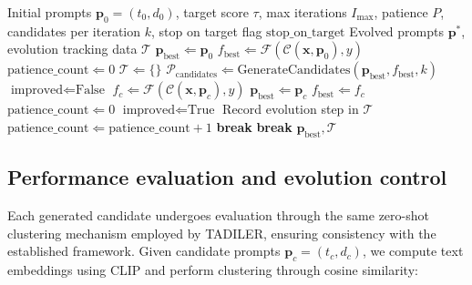 \documentclass[pdflatex,sn-mathphys-num]{sn-jnl}%
\theoremstyle{thmstyleone}%
\theoremstyle{thmstyletwo}%
\theoremstyle{thmstylethree}%
\begin{document}
\begin{algorithm}
\caption{Adaptive Prompt Evolution Algorithm}\label{alg:ape_evolution}
\begin{algorithmic}[1]
\Require Initial prompts $\mathbf{p}_0 = (t_0, d_0)$, target score $\tau$, max iterations $I_{\text{max}}$, patience $P$, candidates per iteration $k$, stop on target flag $\text{stop\_on\_target}$
\Ensure Evolved prompts $\mathbf{p}^*$, evolution tracking data $\mathcal{T}$
\State $\mathbf{p}_{\text{best}} \Leftarrow \mathbf{p}_0$
\State $f_{\text{best}} \Leftarrow \mathcal{F}(\mathcal{C}(\mathbf{x}, \mathbf{p}_0), y)$
\State $\text{patience\_count} \Leftarrow 0$
\State $\mathcal{T} \Leftarrow \{\}$ 
    \State $\mathcal{P}_{\text{candidates}} \Leftarrow \text{GenerateCandidates}(\mathbf{p}_{\text{best}}, f_{\text{best}}, k)$
    \State $\text{improved} \Leftarrow \text{False}$
        \State $f_c \Leftarrow \mathcal{F}(\mathcal{C}(\mathbf{x}, \mathbf{p}_c), y)$
            \State $\mathbf{p}_{\text{best}} \Leftarrow \mathbf{p}_c$
            \State $f_{\text{best}} \Leftarrow f_c$
            \State $\text{patience\_count} \Leftarrow 0$
            \State $\text{improved} \Leftarrow \text{True}$
            \State Record evolution step in $\mathcal{T}$
        \EndIf
    \EndFor
        \State $\text{patience\_count} \Leftarrow \text{patience\_count} + 1$
    \EndIf
        \State \textbf{break} 
    \EndIf
        \State \textbf{break} 
    \EndIf
\EndFor
\State \Return $\mathbf{p}_{\text{best}}, \mathcal{T}$
\end{algorithmic}
\end{algorithm}





\subsection{Performance evaluation and evolution control}
Each generated candidate undergoes evaluation through the same zero-shot clustering mechanism employed by TADILER, ensuring consistency with the established framework. Given candidate prompts $\mathbf{p}_c = (t_c, d_c)$, we compute text embeddings using CLIP and perform clustering through cosine similarity:
\end{document}

